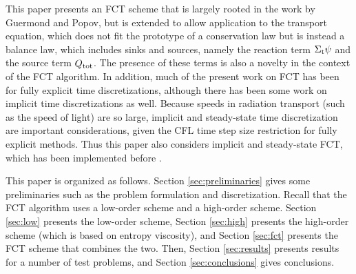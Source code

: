 This paper presents an FCT scheme that is largely rooted in the work by Guermond
and Popov, but is extended to allow application to the transport equation,
which does not fit the prototype of a conservation law but is instead a
balance law, which includes sinks and sources, namely the reaction term
$\Sigma_\textup{t}\psi$ and the source term $Q_\textup{tot}$. The presence
of these terms is also a novelty in the context of the FCT algorithm.
In addition, much of the present work on FCT has been for fully explicit time
discretizations, although there has been some work on implicit time discretizations
as well. Because speeds in radiation transport (such as the speed of light)
are so large, implicit and steady-state time discretization are important
considerations, given the CFL time step size restriction for fully explicit
methods. Thus this paper also considers implicit and steady-state FCT, which
has been implemented before \cite{implicit_FCT}.

This paper is organized as follows. Section \ref{sec:preliminaries} gives
some preliminaries such as the problem formulation and discretization.
Recall that the FCT algorithm uses a low-order scheme and a high-order scheme.
Section \ref{sec:low} presents the low-order scheme, Section \ref{sec:high}
presents the high-order scheme (which is based on entropy viscosity),
and Section \ref{sec:fct} presents the FCT scheme that combines the two. Then, Section
\ref{sec:results} presents results for a number of test problems, and
Section \ref{sec:conclusions} gives conclusions.
